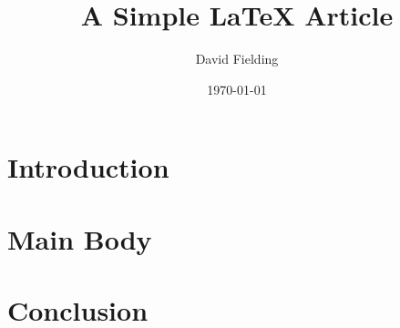 \documentclass{article}
\title{A Simple LaTeX Article}
\author{David Fielding}
\date{\today}
\begin{document}
\maketitle

\section{Introduction}
\lipsum[1] %

\section{Main Body}
\lipsum[2-4] %

\section{Conclusion}
\lipsum[5] %
\end{document}
